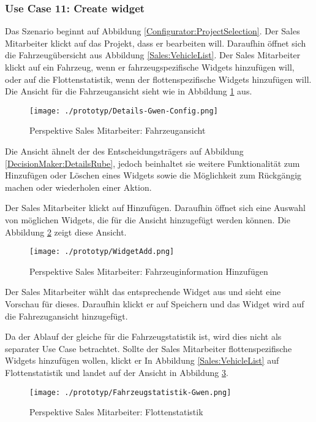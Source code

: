 \subsubsection{Use Case 11: Create widget}

Das Szenario beginnt auf Abbildung \ref{Configurator:ProjectSelection}. Der Sales Mitarbeiter klickt auf das Projekt, dass er bearbeiten will. Daraufhin öffnet sich die Fahrzeugübersicht aus Abbildung \ref{Sales:VehicleList}. Der Sales Mitarbeiter klickt auf ein Fahrzeug, wenn er fahrzeugspezifische Widgets hinzufügen will, oder auf die Flottenstatistik, wenn der flottenspezifische Widgets hinzufügen will. Die Ansicht für die Fahrzeugansicht sieht wie in Abbildung \ref{Sales:VehicleInformation} aus. 

\begin{figure}[ht]
  \centering
  \texttt{[image: ./prototyp/Details-Gwen-Config.png]}
  \caption{Perspektive Sales Mitarbeiter: Fahrzeugansicht}
  \label{Sales:VehicleInformation}
\end{figure}

Die Ansicht ähnelt der des Entscheidungsträgers auf Abbildung \ref{DecisionMaker:DetailsRube}, jedoch beinhaltet sie weitere Funktionalität zum Hinzufügen oder Löschen eines Widgets sowie die Möglichkeit zum Rückgängig machen oder wiederholen einer Aktion.

Der Sales Mitarbeiter klickt auf Hinzufügen. Daraufhin öffnet sich eine Auswahl von möglichen Widgets, die für die Ansicht hinzugefügt werden können. Die Abbildung \ref{Sales:AddWidget} zeigt diese Ansicht.

\begin{figure}[ht]
  \centering
  \texttt{[image: ./prototyp/WidgetAdd.png]}
  \caption{Perspektive Sales Mitarbeiter: Fahrzeuginformation Hinzufügen}
  \label{Sales:AddWidget}
\end{figure}

Der Sales Mitarbeiter wählt das entsprechende Widget aus und sieht eine Vorschau für dieses. Daraufhin klickt er auf Speichern und das Widget wird auf die Fahrezugansicht hinzugefügt.

Da der Ablauf der gleiche für die Fahrzeugstatistik ist, wird dies nicht als separater Use Case betrachtet. Sollte der Sales Mitarbeiter flottenspezifische Widgets hinzufügen wollen, klickt er In Abbildung \ref{Sales:VehicleList} auf Flottenstatistik und landet auf der Ansicht in Abbildung \ref{Sales:Fleet}.

\begin{figure}[ht]
  \centering
  \texttt{[image: ./prototyp/Fahrzeugstatistik-Gwen.png]}
  \caption{Perspektive Sales Mitarbeiter: Flottenstatistik}
  \label{Sales:Fleet}
\end{figure}

